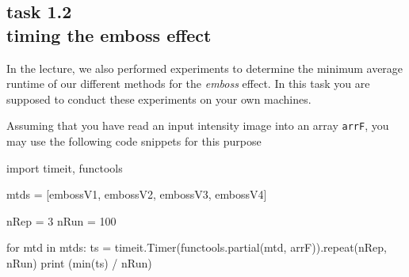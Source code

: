 
\subsection*{task 1.2 \\[1ex] timing the emboss effect}

In the lecture, we also performed experiments to determine the minimum average runtime of our different methods for the \emph{emboss} effect. In this task you are supposed to conduct these experiments on your own machines.

Assuming that you have read an input intensity image into an array \texttt{arrF}, you may use the following code snippets for this purpose
\begin{python}
import timeit, functools


mtds = [embossV1, embossV2, embossV3, embossV4]

nRep =   3
nRun = 100
    
for mtd in mtds:
	ts = timeit.Timer(functools.partial(mtd, arrF)).repeat(nRep, nRun)
	print (min(ts) / nRun)
\end{python}



